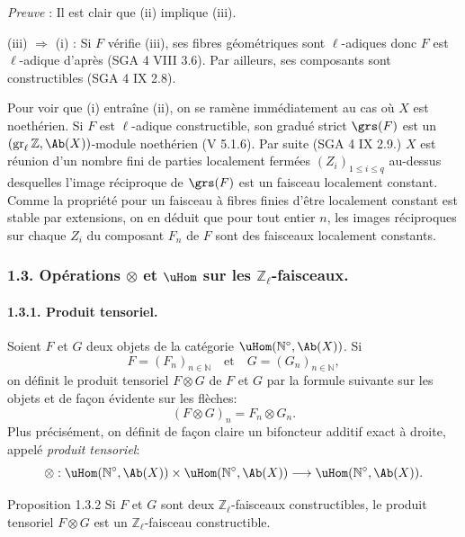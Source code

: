 \emph{Preuve} : Il est clair que (ii) implique (iii).

(iii) \(\Longrightarrow\) (i) : Si \(F\) vérifie (iii), ses fibres géométriques sont \(\ell\)-adiques donc \(F\) est \(\ell\)-adique d'après (SGA 4 VIII 3.6). Par ailleurs, ses composants sont constructibles (SGA 4 IX 2.8).

Pour voir que (i) entraîne (ii), on se ramène immédiatement au cas où \(X\) est noethérien. Si \(F\) est \(\ell\)-adique constructible, son gradué strict \(\grs(F)\) est un \((\operatorname{gr}_\ell\mathbb{Z},\Ab(X))\)-module noethérien (V 5.1.6). Par suite (SGA 4 IX 2.9.) \(X\) est réunion d'un nombre fini de parties localement fermées \((Z_i)_{1\le i\le q}\) au-dessus desquelles l'image réciproque de \(\grs(F)\) est un faisceau localement constant. Comme la propriété pour un faisceau à fibres finies d'être localement constant est stable par extensions, on en déduit que pour tout entier \(n\), les images réciproques sur chaque \(Z_i\) du composant \(F_n\) de \(F\) sont des faisceaux localement constants.

\subsubsection*{1.3. Opérations \(\otimes\) et \(\uHom\) sur les \(\mathbb{Z}_\ell\)-faisceaux.}

\paragraph{1.3.1. Produit tensoriel.}
Soient \(F\) et \(G\) deux objets de la catégorie \(\uHom(\mathbb{N}^\circ,\Ab(X))\). Si
\[
F=(F_n)_{n\in\mathbb{N}}\quad\text{et}\quad G=(G_n)_{n\in\mathbb{N}},
\]
on définit le produit tensoriel \(F\otimes G\) de \(F\) et \(G\) par la formule suivante sur les objets et de façon évidente sur les flèches:
\[
(F\otimes G)_n=F_n\otimes G_n.
\]
Plus précisément, on définit de façon claire un bifoncteur additif exact à droite, appelé \emph{produit tensoriel}:
\[
\otimes:\uHom(\mathbb{N}^\circ,\Ab(X))\times \uHom(\mathbb{N}^\circ,\Ab(X))
\longrightarrow \uHom(\mathbb{N}^\circ,\Ab(X)).
\]

\begin{statement}{Proposition 1.3.2}
Si \(F\) et \(G\) sont deux \(\mathbb{Z}_\ell\)-faisceaux constructibles, le produit tensoriel \(F\otimes G\) est un \(\mathbb{Z}_\ell\)-faisceau constructible.
\end{statement}

